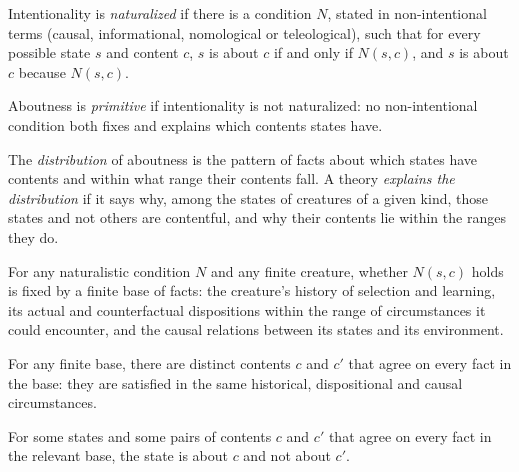 \documentclass{situationist-preprint}
\begin{document}
\begin{definition}[Naturalization]\label{d:nat}
Intentionality is \emph{naturalized} if there is a condition $N$, stated in non-intentional terms (causal, informational, nomological or teleological), such that for every possible state $s$ and content $c$, $s$ is about $c$ if and only if $N(s,c)$, and $s$ is about $c$ because $N(s,c)$.
\end{definition}

\begin{definition}[Primitive]\label{d:prim}
Aboutness is \emph{primitive} if intentionality is not naturalized: no non-intentional condition both fixes and explains which contents states have.
\end{definition}

\begin{definition}[Distribution]\label{d:dist}
The \emph{distribution} of aboutness is the pattern of facts about which states have contents and within what range their contents fall. A theory \emph{explains the distribution} if it says why, among the states of creatures of a given kind, those states and not others are contentful, and why their contents lie within the ranges they do.
\end{definition}

\begin{principle}\label{p:base}
For any naturalistic condition $N$ and any finite creature, whether $N(s,c)$ holds is fixed by a finite base of facts: the creature's history of selection and learning, its actual and counterfactual dispositions within the range of circumstances it could encounter, and the causal relations between its states and its environment.
\end{principle}

\begin{principle}[Underdetermination]\label{p:under}
For any finite base, there are distinct contents $c$ and $c'$ that agree on every fact in the base: they are satisfied in the same historical, dispositional and causal circumstances.
\end{principle}

\begin{principle}[Determinacy]\label{p:det}
For some states and some pairs of contents $c$ and $c'$ that agree on every fact in the relevant base, the state is about $c$ and not about $c'$.
\end{principle}
\end{document}
